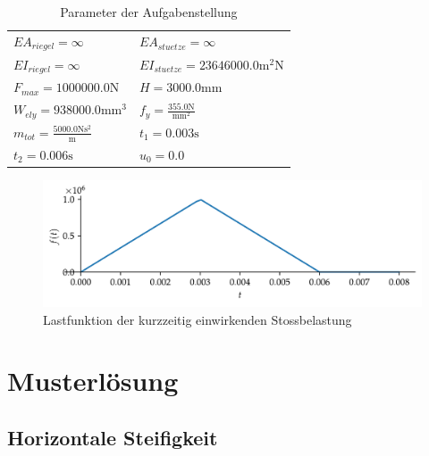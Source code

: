 \documentclass[
  letterpaper,
  DIV=11]{scrreprt}
\begin{document}
\hypertarget{tbl-parameter_impuls}{}
\begin{longtable}[]{@{}
  >{\raggedright\arraybackslash}p{}
  >{\raggedright\arraybackslash}p{}@{}}
\caption{\label{tbl-parameter_impuls}Parameter der
Aufgabenstellung}\tabularnewline
\toprule\noalign{}
\endfirsthead
\endhead
\bottomrule\noalign{}
\endlastfoot
\(EA_{riegel} = \infty\) & \(EA_{stuetze} = \infty\) \\
\(EI_{riegel} = \infty\) &
\(EI_{stuetze} = 23646000.0 \text{m}^{2} \text{N}\) \\
\(F_{max} = 1000000.0 \text{N}\) & \(H = 3000.0 \text{mm}\) \\
\(W_{el y} = 938000.0 \text{mm}^{3}\) &
\(f_{y} = \frac{355.0 \text{N}}{\text{mm}^{2}}\) \\
\(m_{tot} = \frac{5000.0 \text{N} \text{s}^{2}}{\text{m}}\) &
\(t_{1} = 0.003 \text{s}\) \\
\(t_{2} = 0.006 \text{s}\) & \(u_{0} = 0.0\) \\
\end{longtable}

\begin{figure}[H]

{\centering \includegraphics{index_files/mediabag/ems_02_files/figure-pdf/fig-ems_impuls_lastfunktion-output-1.pdf}

}

\caption{\label{fig-ems_impuls_lastfunktion}Lastfunktion der kurzzeitig
einwirkenden Stossbelastung}

\end{figure}

\newpage{}

\hypertarget{musterluxf6sung-2}{%
\section{Musterlösung}\label{musterluxf6sung-2}}

\hypertarget{horizontale-steifigkeit-1}{%
\subsection{Horizontale Steifigkeit}\label{horizontale-steifigkeit-1}}
\end{document}
